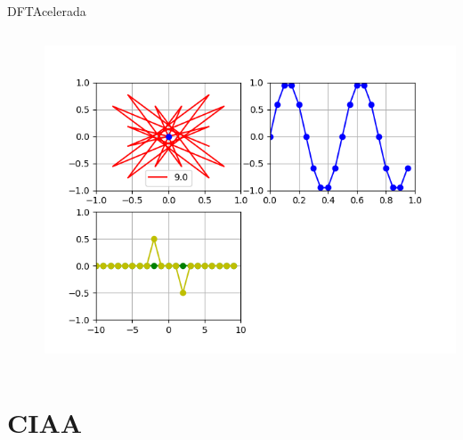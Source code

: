\begin{frame}{DFT}{Acelerada}
   \handsonicon
   \begin{columns}[c]
      \hspace{2pt}
      \begin{column}{.3\textwidth}
         
      \end{column}
      \hspace{2pt}
      \vrule
      \hspace{2pt}
      \begin{column}{.3\textwidth}
         
      \end{column}
      \hspace{2pt}
      \vrule
      \hspace{2pt}
      \begin{column}{.4\textwidth}
         \centering\includegraphics[width=1.0\textwidth]{3_clase/euler5}
      \end{column}
      \hspace{2pt}
   \end{columns}
   \vfill
\end{frame}
\section{CIAA}
